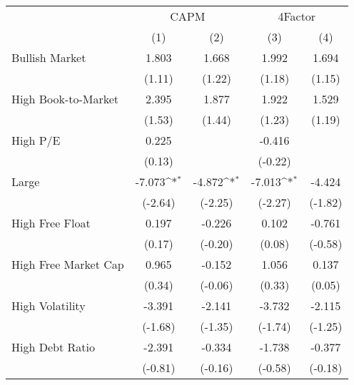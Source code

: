 {
\def\sym#1{\ifmmode^{#1}\else\(^{#1}\)\fi}
\begin{tabular}{l*{4}{c}}
\hline\hline
                &\multicolumn{2}{c}{CAPM}             &\multicolumn{2}{c}{4Factor}          \\\cmidrule(lr){2-3}\cmidrule(lr){4-5}
                &\multicolumn{1}{c}{(1)}         &\multicolumn{1}{c}{(2)}         &\multicolumn{1}{c}{(3)}         &\multicolumn{1}{c}{(4)}         \\
\hline
Bullish Market  &    1.803         &    1.668         &    1.992         &    1.694         \\
                &   (1.11)         &   (1.22)         &   (1.18)         &   (1.15)         \\
[1em]
High Book-to-Market&    2.395         &    1.877         &    1.922         &    1.529         \\
                &   (1.53)         &   (1.44)         &   (1.23)         &   (1.19)         \\
[1em]
High P/E        &    0.225         &                  &   -0.416         &                  \\
                &   (0.13)         &                  &  (-0.22)         &                  \\
[1em]
Large           &   -7.073\sym{*}  &   -4.872\sym{*}  &   -7.013\sym{*}  &   -4.424         \\
                &  (-2.64)         &  (-2.25)         &  (-2.27)         &  (-1.82)         \\
[1em]
High Free Float &    0.197         &   -0.226         &    0.102         &   -0.761         \\
                &   (0.17)         &  (-0.20)         &   (0.08)         &  (-0.58)         \\
[1em]
High Free Market Cap&    0.965         &   -0.152         &    1.056         &    0.137         \\
                &   (0.34)         &  (-0.06)         &   (0.33)         &   (0.05)         \\
[1em]
High Volatility &   -3.391         &   -2.141         &   -3.732         &   -2.115         \\
                &  (-1.68)         &  (-1.35)         &  (-1.74)         &  (-1.25)         \\
[1em]
High Debt Ratio &   -2.391         &   -0.334         &   -1.738         &   -0.377         \\
                &  (-0.81)         &  (-0.16)         &  (-0.58)         &  (-0.18)         \\

\end{tabular}}
